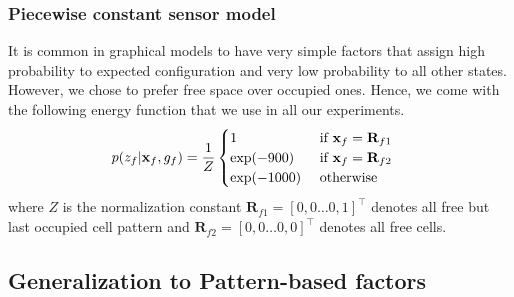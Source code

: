 \documentclass[letterpaper, 10 pt, conference]{ieeeconf} %
\newcommand{\vect}[1]{\mathbf{#1}}
\begin{document}

\subsubsection{Piecewise constant sensor model}
It is common in graphical models to have very simple factors that assign high
probability to expected configuration and very low probability to all other
states. 
%
However, we chose to prefer free space over occupied ones. Hence, we come with
the following energy function that we use in all our experiments.
\begin{align}
  p(z_f|\map_f, g_f) &= \frac{1}{Z}\begin{cases}
                       1 & \text{ if } \map_f = \vect{R}_{f1}\\
              \exp(-900) & \text{ if } \map_f = \vect{R}_{f2}\\
           \exp(-1000) & \text{ otherwise}
  \end{cases}
  \label{eq:piecewiseconstant}
\end{align}
where $Z$ is the normalization constant $\vect{R}_{f1} = [0, 0 \dots 0,
1]^\top$ denotes all free but last occupied cell pattern and $\vect{R}_{f2} =
[0, 0 \dots 0, 0]^\top$ denotes all free cells.

\subsection{Generalization to Pattern-based factors}
\label{sec:patternfunctions}
\end{document}
